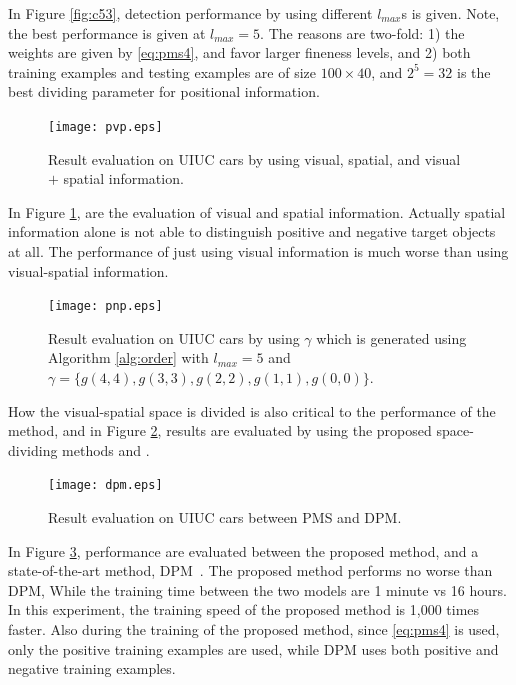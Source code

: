 \documentclass[paper]{ieice}
\begin{document}
In Figure \ref{fig:c53}, detection performance by using different $l_{max}$s is given. Note, the best performance is given at $l_{max}=5$. The reasons are two-fold: 1) the weights are given by \ref{eq:pms4}, and favor larger fineness levels, and 2) both training examples and testing examples are of size $100 \times 40$, and $2^5=32$ is the best dividing parameter for positional information.

\begin{figure}[!htbp]
\centering

\texttt{[image: pvp.eps]}


\caption[Result evaluation by using results from only visual or spatial information]{Result evaluation on UIUC cars by using visual, spatial, and visual $+$ spatial information.}
\label{fig:c54}
\end{figure}


In Figure \ref{fig:c54}, are the evaluation of visual and spatial information. Actually spatial information alone is not able to distinguish positive and negative target objects at all. The performance of just using visual information is much worse than using visual-spatial information.

\begin{figure}[!htbp]
\centering

\texttt{[image: pnp.eps]}


\caption[Result comparison with method using dividing methods of \cite{pmk}]{Result evaluation on UIUC cars by using $\gamma$ which is generated using Algorithm \ref{alg:order} with $l_{max}=5$ and $\gamma=\{g(4,4),g(3,3),g(2,2),g(1,1),g(0,0)\}$.}
\label{fig:c55}
\end{figure}


How the visual-spatial space is divided is also critical to the performance of the method, and in Figure \ref{fig:c55}, results are evaluated by using the proposed space-dividing methods and \cite{pmk}.


\begin{figure}[!htbp]
\centering

\texttt{[image: dpm.eps]}


\caption[Result comparison with deformable part model~\cite{ac31}]{Result evaluation on UIUC cars between PMS and DPM.}
\label{fig:c56}
\end{figure}



In Figure \ref{fig:c56}, performance are evaluated between the proposed method, and a state-of-the-art method, DPM~\cite{ac31}. The proposed method performs no worse than DPM,
While the training time between the two models are 1 minute vs 16 hours. In this experiment, the training speed of the proposed method is 1,000 times faster. Also during the training of the proposed method, since \ref{eq:pms4} is used, only the positive training examples are used, while DPM uses both positive and negative training examples.
\end{document}
